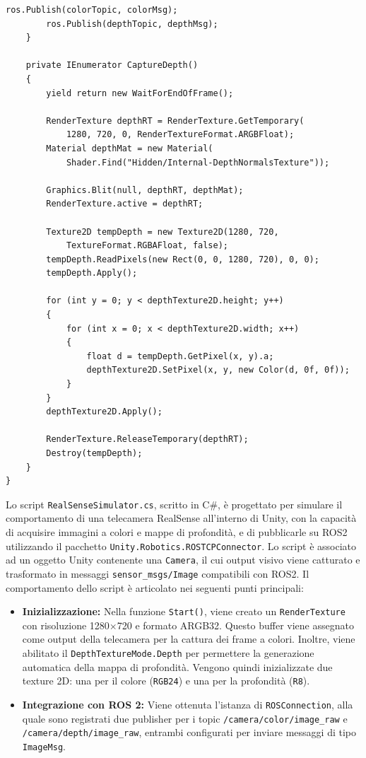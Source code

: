 \documentclass[11pt]{report}
\begin{document}
\begin{lstlisting}[caption=Publisher di Unity, label=lst:base, lineskip=0.3em]
        ros.Publish(colorTopic, colorMsg);
        ros.Publish(depthTopic, depthMsg);
    }

    private IEnumerator CaptureDepth()
    {
        yield return new WaitForEndOfFrame();
        
        RenderTexture depthRT = RenderTexture.GetTemporary(
            1280, 720, 0, RenderTextureFormat.ARGBFloat);
        Material depthMat = new Material(
            Shader.Find("Hidden/Internal-DepthNormalsTexture"));
        
        Graphics.Blit(null, depthRT, depthMat);
        RenderTexture.active = depthRT;
        
        Texture2D tempDepth = new Texture2D(1280, 720, 
            TextureFormat.RGBAFloat, false);
        tempDepth.ReadPixels(new Rect(0, 0, 1280, 720), 0, 0);
        tempDepth.Apply();

        for (int y = 0; y < depthTexture2D.height; y++)
        {
            for (int x = 0; x < depthTexture2D.width; x++)
            {
                float d = tempDepth.GetPixel(x, y).a;
                depthTexture2D.SetPixel(x, y, new Color(d, 0f, 0f));
            }
        }
        depthTexture2D.Apply();

        RenderTexture.ReleaseTemporary(depthRT);
        Destroy(tempDepth);
    }
}
\end{lstlisting}
\vspace{1em} %
Lo script \texttt{RealSenseSimulator.cs}, scritto in C\#, è progettato per simulare il comportamento di una telecamera RealSense all'interno di Unity, con la capacità di acquisire immagini a colori e mappe di profondità, e di pubblicarle su ROS2 utilizzando il pacchetto \texttt{Unity.Robotics.ROSTCPConnector}.
\newline
Lo script è associato ad un oggetto Unity contenente una \texttt{Camera}, il cui output visivo viene catturato e trasformato in messaggi \texttt{sensor\_msgs/Image} compatibili con ROS2. Il comportamento dello script è articolato nei seguenti punti principali:

\begin{itemize}
  \item \textbf{Inizializzazione:} Nella funzione \texttt{Start()}, viene creato un \texttt{RenderTexture} con risoluzione 1280$\times$720 e formato ARGB32. Questo buffer viene assegnato come output della telecamera per la cattura dei frame a colori. Inoltre, viene abilitato il \texttt{DepthTextureMode.Depth} per permettere la generazione automatica della mappa di profondità. Vengono quindi inizializzate due texture 2D: una per il colore (\texttt{RGB24}) e una per la profondità (\texttt{R8}).
  
  \item \textbf{Integrazione con ROS 2:} Viene ottenuta l’istanza di \texttt{ROSConnection}, alla quale sono registrati due publisher per i topic \texttt{/camera/color/image\_raw} e \texttt{/camera/depth/image\_raw}, entrambi configurati per inviare messaggi di tipo \texttt{ImageMsg}.
\end{itemize}
\end{document}
